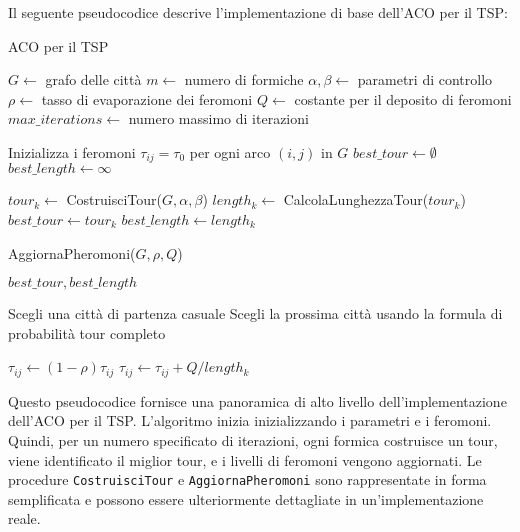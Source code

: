 Il seguente pseudocodice descrive l'implementazione di base dell'\gls{ACO} per il \gls{TSP}:

\begin{algorithm}
	\caption{\gls{ACO} per il \gls{TSP}}\label{alg:aco-tsp}
	\begin{algorithmic}[1]
		\State $G \gets$ grafo delle città
		\State $m \gets$ numero di formiche
		\State $\alpha, \beta \gets$ parametri di controllo
		\State $\rho \gets$ tasso di evaporazione dei feromoni
		\State $Q \gets$ costante per il deposito di feromoni
		\State $max\_iterations \gets$ numero massimo di iterazioni

		\State Inizializza i feromoni $\tau_{ij} = \tau_0$ per ogni arco $(i,j)$ in $G$
		\State $best\_tour \gets \emptyset$
		\State $best\_length \gets \infty$

		\State $tour_k \gets$ CostruisciTour($G, \alpha, \beta$)
		\State $length_k \gets$ CalcolaLunghezzaTour($tour_k$)
		\State $best\_tour \gets tour_k$
		\State $best\_length \gets length_k$
		\EndIf
		\EndFor

		\State AggiornaPheromoni($G, \rho, Q$)
		\EndFor

		\State \Return $best\_tour, best\_length$
		\EndProcedure

		\State Scegli una città di partenza casuale
		\State Scegli la prossima città usando la formula di probabilità
		\EndWhile
		\State \Return tour completo
		\EndProcedure

		\State $\tau_{ij} \gets (1-\rho)\tau_{ij}$
		\State $\tau_{ij} \gets \tau_{ij} + Q/length_k$
		\EndIf
		\EndFor
		\EndFor
		\EndProcedure
	\end{algorithmic}
\end{algorithm}

Questo pseudocodice fornisce una panoramica di alto livello dell'implementazione dell'ACO per il \gls{TSP}. L'algoritmo inizia inizializzando i parametri e i feromoni. Quindi, per un numero specificato di iterazioni, ogni formica costruisce un tour, viene identificato il miglior tour, e i livelli di feromoni vengono aggiornati. Le procedure \texttt{CostruisciTour} e \texttt{AggiornaPheromoni} sono rappresentate in forma semplificata e possono essere ulteriormente dettagliate in un'implementazione reale.

